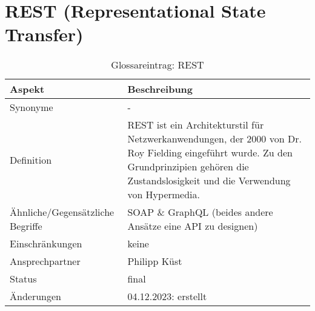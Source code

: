 \section*{REST (Representational State Transfer)}\label{sec:glossar_rest}
\begin{table}[H]
    \label{tab:glossar_rest}
    \begin{tabularx}{\textwidth}{|l|X|}
        \hline
        \textbf{Aspekt}                  & \textbf{Beschreibung}                                        \\
        \hline
        Synonyme                         & -                                                            \\
        \hline
        Definition & REST ist ein Architekturstil für Netzwerkanwendungen, der 2000 von Dr. Roy Fielding eingeführt wurde.
        Zu den Grundprinzipien gehören die Zustandslosigkeit und die Verwendung von Hypermedia. \\
        \hline
        Ähnliche/Gegensätzliche Begriffe & SOAP \& GraphQL (beides andere Ansätze eine API zu designen) \\
        \hline
        Einschränkungen                  & keine                                                        \\
        \hline
        Ansprechpartner                  & Philipp Küst                                                 \\
        \hline
        Status                           & final                                                        \\
        \hline
        Änderungen                       & 04.12.2023: erstellt                                         \\
        \hline
    \end{tabularx}
    \caption{Glossareintrag: REST}
\end{table}

